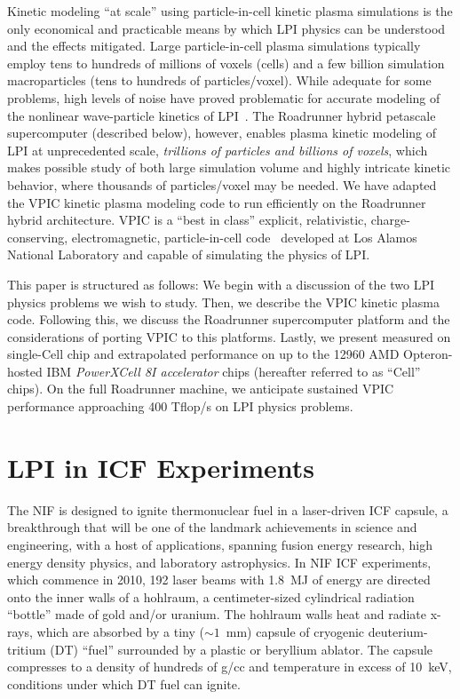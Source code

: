 \documentclass[10pt]{article}
\begin{document}
Kinetic modeling ``at scale'' using particle-in-cell kinetic plasma
simulations is the only economical and practicable means by which LPI
physics can be understood and the effects mitigated.
Large particle-in-cell plasma 
simulations typically employ tens to hundreds of millions of voxels
(cells) and a few billion simulation macroparticles (tens to hundreds
of particles/voxel).  While adequate for some problems, high levels of
noise have proved problematic for accurate modeling of the nonlinear
wave-particle kinetics of LPI~\cite{Yin_et_al_Phys_Plasmas_2006}.  The
Roadrunner hybrid petascale supercomputer (described below), however,
enables plasma kinetic modeling of LPI at unprecedented scale,
\textit{trillions of particles and billions of voxels}, which makes 
possible study of both large
simulation volume and highly intricate kinetic behavior, where
thousands of particles/voxel may be needed.  We have adapted the VPIC
kinetic plasma modeling code to run efficiently on the Roadrunner
hybrid architecture.  VPIC is a ``best in class'' explicit,
relativistic, charge-conserving, electromagnetic, particle-in-cell
code~\cite{Bowers_et_al_Phys_Plasmas_2007} developed at Los Alamos
National Laboratory and capable of simulating the physics of LPI.

This paper is structured as follows: We begin with a discussion of the
two LPI physics problems we wish to study.  Then, we describe the VPIC
kinetic plasma code.  Following this, we discuss the Roadrunner
supercomputer platform and the considerations of porting VPIC to this
platforms.  Lastly, we present measured on single-Cell chip and
extrapolated performance on up to the 12960 AMD Opteron-hosted IBM
\emph{PowerXCell 8I accelerator} chips (hereafter referred to as
``Cell'' chips).  On the full Roadrunner machine, we anticipate
sustained VPIC performance approaching 400 Tflop/s on LPI physics
problems.

\section{LPI in ICF Experiments}

The NIF is designed to ignite thermonuclear fuel in a laser-driven ICF
capsule, a breakthrough that will be one of the landmark achievements
in science and engineering, with a host of applications, spanning
fusion energy research, high energy density physics, and
laboratory astrophysics.  In NIF ICF experiments, which commence in
2010, 192 laser beams with 1.8~MJ of energy are directed onto the
inner walls of a hohlraum, a centimeter-sized cylindrical radiation
``bottle'' made of gold and/or uranium.  The hohlraum walls heat and
radiate x-rays, which are absorbed by a tiny ($\sim 1$~mm) capsule of
cryogenic deuterium-tritium (DT) ``fuel'' surrounded by a plastic or
beryllium ablator.  The capsule compresses to a density of hundreds of
g/cc and temperature in excess of 10~keV, conditions under which DT
fuel can ignite.
\end{document}
